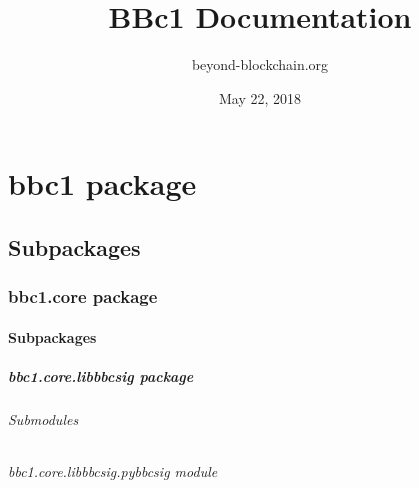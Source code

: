 \documentclass[letterpaper,10pt,english]{sphinxmanual}
\title{BBc1 Documentation}
\date{May 22, 2018}
\author{beyond-blockchain.org}
\begin{document}
\maketitle
\sphinxtableofcontents
{}\label{\detokenize{index::doc}}



\chapter{bbc1 package}
\label{\detokenize{bbc1:welcome-to-bbc1-s-documentation}}\label{\detokenize{bbc1:bbc1-package}}\label{\detokenize{bbc1::doc}}

\section{Subpackages}
\label{\detokenize{bbc1:subpackages}}

\subsection{bbc1.core package}
\label{\detokenize{bbc1.core:bbc1-core-package}}\label{\detokenize{bbc1.core::doc}}

\subsubsection{Subpackages}
\label{\detokenize{bbc1.core:subpackages}}

\paragraph{bbc1.core.libbbcsig package}
\label{\detokenize{bbc1.core.libbbcsig:bbc1-core-libbbcsig-package}}\label{\detokenize{bbc1.core.libbbcsig::doc}}

\subparagraph{Submodules}
\label{\detokenize{bbc1.core.libbbcsig:submodules}}

\subparagraph{bbc1.core.libbbcsig.pybbcsig module}
\label{\detokenize{bbc1.core.libbbcsig.pybbcsig:module-bbc1.core.libbbcsig.pybbcsig}}\label{\detokenize{bbc1.core.libbbcsig.pybbcsig:bbc1-core-libbbcsig-pybbcsig-module}}\label{\detokenize{bbc1.core.libbbcsig.pybbcsig::doc}}
\end{document}
